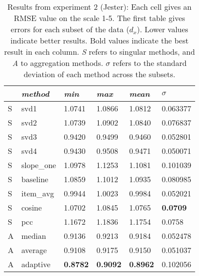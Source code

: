 \begin{table}[p]
  \begin{tabular*}{\textwidth}{ l p{3cm} p{2cm} p{2cm} p{2cm} p{2cm} }
    \toprule
      ~ & \emph{method} & 
      \emph{min} & \emph{max} & \emph{mean} & $\sigma$\\
    \midrule
S & svd1       &  1.0741  &  1.0866  &  1.0812  &  0.063377  \\
S & svd2       &  1.0739  &  1.0902  &  1.0840  &  0.076837  \\
S & svd3       &  0.9420  &  0.9499  &  0.9460  &  0.052801  \\
S & svd4       &  0.9430  &  0.9508  &  0.9471  &  0.050071  \\
S & slope\_one &  1.0978  &  1.1253  &  1.1081  &  0.101039  \\
S & baseline   &  1.0859  &  1.1012  &  1.0935  &  0.080985  \\
S & item\_avg  &  0.9944  &  1.0023  &  0.9984  &  0.052021  \\
S & cosine     &  1.0702  &  1.0845  &  1.0765  &  \textbf{0.0709}    \\
S & pcc        &  1.1672  &  1.1836  &  1.1754  &  0.0758    \\
\midrule
A & median   &  0.9136  &  0.9213  &  0.9184  &  0.052478  \\
A & average  &  0.9108  &  0.9175  &  0.9150  &  0.051037  \\
A & adaptive  &  \textbf{0.8782}  &  \textbf{0.9092}  &  \textbf{0.8962}  &  0.102056  \\
    \bottomrule
  \end{tabular*}
  \vspace{2em}

  \caption[Results from Experiment 2]{
    Results from experiment 2 (Jester):
    Each cell gives an RMSE value on the scale 1-5.
    The first table gives errors for each subset of the data ($d_x$).
    Lower values indicate better results.
    Bold values indicate the best result in each column.
    \emph{S} refers to singular methods, and \emph{A} to aggregation methods.
    $\sigma$ refers to the standard deviation of each method across the subsets.
  }
  \label{table:results:e2}
\end{table}

